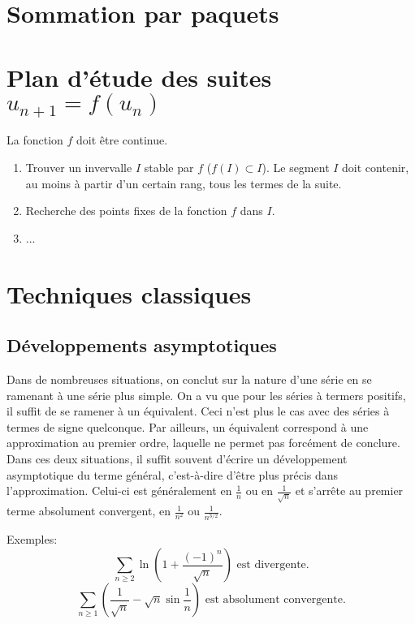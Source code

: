 \section{Sommation par paquets}


\section{Plan d'étude des suites \texorpdfstring{$u_{n+1} = f(u_n)$}{u_(n+1) = f(u_n)}}

La fonction $f$ doit être continue. \\

\begin{enumerate}
    \item Trouver un invervalle $I$ stable par $f$ ($f(I) \subset I$). Le segment $I$ doit contenir, au moins à partir d'un certain rang, tous les termes de la suite.
    \item Recherche des points fixes de la fonction $f$ dans $I$.
    \item ...
\end{enumerate}

\section{Techniques classiques}
\subsection{Développements asymptotiques}

Dans de nombreuses situations, on conclut sur la nature d'une série en se ramenant à une série plus simple. On a vu que pour les séries à termers positifs, il suffit de se ramener à un équivalent. Ceci n'est plus le cas avec des séries à termes de signe quelconque. Par ailleurs, un équivalent correspond à une approximation au premier ordre, laquelle ne permet pas forcément de conclure. \\
Dans ces deux situations, il suffit souvent d'écrire un développement asymptotique du terme général, c'est-à-dire d'être plus précis dans l'approximation. Celui-ci est généralement en $\frac{1}{n}$ ou en $\frac{1}{\sqrt{n}}$ et s'arrête au premier terme absolument convergent, en $\frac{1}{n^2}$ ou $\frac{1}{n^{3/2}}$.

Exemples: \\
$$\sum_{n \geqslant 2} \ln \left(1 + \frac{(-1)^n}{\sqrt{n}}\right) \text{ est divergente}.$$
$$\sum_{n \geqslant 1} \left(\frac{1}{\sqrt{n}} - \sqrt{n} \sin \frac{1}{n} \right) \text{ est absolument convergente}.$$

